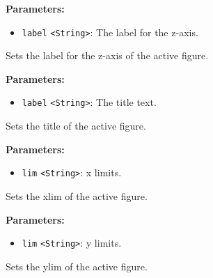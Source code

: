 \documentclass[12pt,a4paper]{article}
\begin{document}
\vspace{5mm}
\noindent {}


\noindent \textbf{Parameters:}
\begin{itemize}
  \item \texttt{label} \texttt{<String>}: The label for the z-axis.
\end{itemize}

\noindent Sets the label for the z-axis of the active figure.

\vspace{5mm}
\noindent {}


\noindent \textbf{Parameters:}
\begin{itemize}
  \item \texttt{label} \texttt{<String>}: The title text.
\end{itemize}

\noindent Sets the title of the active figure.

\vspace{5mm}
\noindent {}


\noindent \textbf{Parameters:}
\begin{itemize}
  \item \texttt{lim} \texttt{<String>}: x limits.
\end{itemize}

\noindent Sets the xlim of the active figure.

\vspace{5mm}
\noindent {}


\noindent \textbf{Parameters:}
\begin{itemize}
  \item \texttt{lim} \texttt{<String>}: y limits.
\end{itemize}

\noindent Sets the ylim of the active figure.

\vspace{5mm}
\noindent {}
\end{document}
